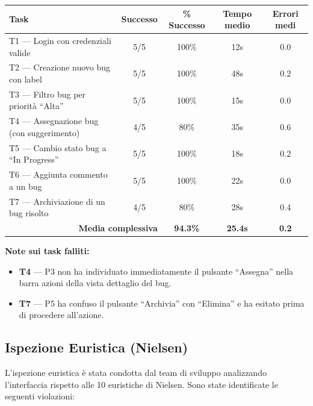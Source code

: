 ﻿\documentclass[a4paper,11pt]{article}
\begin{document}
\begin{tabular}{|l|c|c|c|c|}
\hline
\textbf{Task} & \textbf{Successo} & \textbf{\% Successo} & \textbf{Tempo medio} & \textbf{Errori medi} \\
\hline
T1 --- Login con credenziali valide & 5/5 & 100\% & 12s & 0.0 \\
\hline
T2 --- Creazione nuovo bug con label & 5/5 & 100\% & 48s & 0.2 \\
\hline
T3 --- Filtro bug per priorit\`a ``Alta'' & 5/5 & 100\% & 15s & 0.0 \\
\hline
T4 --- Assegnazione bug (con suggerimento) & 4/5 & 80\% & 35s & 0.6 \\
\hline
T5 --- Cambio stato bug a ``In Progress'' & 5/5 & 100\% & 18s & 0.2 \\
\hline
T6 --- Aggiunta commento a un bug & 5/5 & 100\% & 22s & 0.0 \\
\hline
T7 --- Archiviazione di un bug risolto & 4/5 & 80\% & 28s & 0.4 \\
\hline
\multicolumn{2}{|r|}{\textbf{Media complessiva}} & \textbf{94.3\%} & \textbf{25.4s} & \textbf{0.2} \\
\hline
\end{tabular}

\vspace{0.3cm}
\noindent\textbf{Note sui task falliti:}
\begin{itemize}
  \item \textbf{T4} --- P3 non ha individuato immediatamente il pulsante ``Assegna'' nella barra azioni della vista dettaglio del bug.
  \item \textbf{T7} --- P5 ha confuso il pulsante ``Archivia'' con ``Elimina'' e ha esitato prima di procedere all'azione.
\end{itemize}

\subsection{Ispezione Euristica (Nielsen)}

L'ispezione euristica \`e stata condotta dal team di sviluppo analizzando l'interfaccia rispetto alle 10 euristiche di Nielsen. Sono state identificate le seguenti violazioni:
\end{document}
